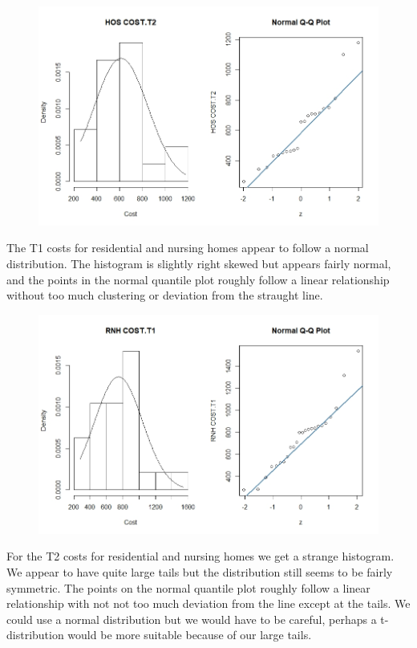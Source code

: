 \documentclass[]{article}
\begin{document}
\begin{figure}[H]
\centering
\includegraphics[width=12cm]{RStudio/jpeg/Norm_HOS_T2.jpeg}
\end{figure}
\newpage
The T1 costs for residential and nursing homes appear to follow a normal distribution. The histogram is slightly right skewed but appears fairly normal, and the points in the normal quantile plot roughly follow a linear relationship without too much clustering or deviation from the straught line.
\begin{figure}[H]
\centering
\includegraphics[width=12cm]{RStudio/jpeg/Norm_RNH_T1.jpeg}
\end{figure}
For the T2 costs for residential and nursing homes we get a strange histogram. We appear to have quite large tails but the distribution still seems to be fairly symmetric. The points on the normal quantile plot roughly follow a linear relationship with not not too much deviation from the line except at the tails. We could use a normal distribution but we would have to be careful, perhaps a t-distribution would be more suitable because of our large tails.
\end{document}
